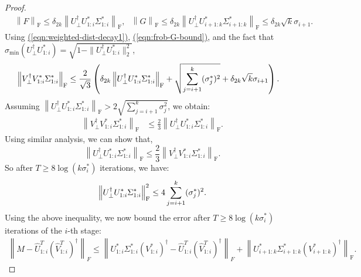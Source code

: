 \documentclass[11pt]{article}
\renewcommand{\eqref}[1]{\hyperref[#1]{(\ref*{#1})}}
\theoremstyle{plain}
\theoremstyle{definition}
\newcommand{\frob}[1]{\left\| {#1} \right\|_\text{F}}
\newcommand{\Ut}{U^{t}}
\newcommand{\Vo}{V^*}
\newcommand{\So}{\Sigma^*}
\newcommand{\Uo}{U^*}
\newcommand{\so}{\sigma^*}
\newcommand{\Vw}{\widehat{V}}
\newcommand{\Uw}{\widehat{U}}
\begin{document}
\begin{proof}
\begin{align}
  &\frob{F} \leq \delta_{2k} \frob{U_{\perp}^{\dag} \Uo_{1:i}\So_{1:i}},\ \ \ \frob{G} \leq \delta_{2k} \frob{U_{\perp}^{\dag} \Uo_{i+1:k}\So_{i+1:k}} \leq \delta_{2k}\sqrt{k}\sigma_{i+1} \label{eqn:frob-G-bound}.
\end{align}
Using \eqref{eqn:weighted-dist-decay1}, \eqref{eqn:frob-G-bound}, and the fact that $\sigma_{\min}(U_\perp^\dag\Uo_{1:i})=\sqrt{1-\|U_\perp^\dag\Uo_{1:i}\|_2^2}$,
\begin{align*}
  \frob{V_{\perp}^{\dag} \Vo_{1:i}\So_{1:i}} 
	&\leq \frac{2}{\sqrt{3}} \left(\delta_{2k} \frob{U_{\perp}^{\dag} \Uo_{1:i}\So_{1:i}}
		+ \sqrt{\sum_{j=i+1}^k \soj} + \delta_{2k}\sqrt{k}\sigma_{i+1} \right).
\end{align*}
Assuming $\frob{U_{\perp}^{\dag} \Uo_{1:i}\So_{1:i}} > 2 \sqrt{\sum_{j=i+1}^k \sigma_j^2}$, we obtain:
\begin{align}
  \frob{V_{\perp}^{\dag} \Vo_{1:i}\So_{1:i}} 
	&\leq \frac{2}{3} \frob{U_{\perp}^{\dag} \Uo_{1:i}\So_{1:i}}. 
\end{align}
Using similar analysis, we can show that, $$\frob{U_{\perp}^{\dag} \Uo_{1:i}\So_{1:i}} 
	\leq \frac{2}{3} \frob{V_{\perp}^{\dag} \Vo_{1:i}\So_{1:i}}. $$
So after $T\geq 8\log(k\so_i)$ iterations, we have:
\begin{align*}
  \frob{U_{\perp}^{\dag} \Uo_{1:i}\So_{1:i}}^2 \leq 4\sum_{j=i+1}^k \soj. 
\end{align*}
Using the above inequality, we now bound the error after $T\geq  8\log(k\so_i)$ iterations of the $i$-th stage: 
\begin{align}\label{eq:sam_err_bc_t_1}
  \left\|M - \Uw^T_{1:i}(\Vw^T_{1:i})^{\dag}\right\|_F
	\leq \left\| \Uo_{1:i}\So_{1:i}\left(\Vo_{1:i}\right)^{\dag} - \Uw^T_{1:i}(\Vw^T_{1:i})^{\dag}\right\|_F + \frob{\Uo_{i+1:k}\So_{i+1:k}\left(\Vo_{i+1:k}\right)^{\dag}}.
\end{align}


\end{proof}
\end{document}
